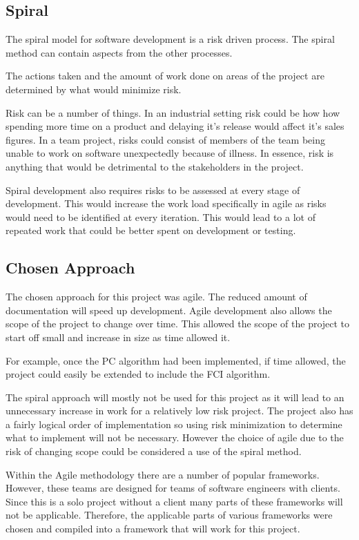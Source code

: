 \documentclass{UoYCSproject}
\begin{document}
\subsection{Spiral}
The spiral model for software development is a risk driven process. The spiral method can contain aspects from the other processes. ~\parencite{boehm1988spiral}

The actions taken and the amount of work done on areas of the project are determined by what would minimize risk.

Risk can be a number of things. In an industrial setting risk could be how how spending more time on a product and delaying it's release would affect it's sales figures. In a team project, risks could  consist of members of the team being unable to work on software unexpectedly because of illness. In essence, risk is anything that would be detrimental to the stakeholders in the project.

Spiral development also requires risks to be assessed at every stage of development. This would increase the work load specifically in agile as risks would need to be identified at every iteration. This would lead to a lot of repeated work that could be better spent on development or testing.  
\subsection{Chosen Approach}

The chosen approach for this project was agile. The reduced amount of documentation will speed up development. Agile development also allows the scope of the project to change over time. This allowed the scope of the project to start off small and increase in size as time allowed it.

For example, once the PC algorithm had been implemented, if time allowed, the project could easily be extended to include the FCI algorithm.

The spiral approach will mostly not be used for this project as it will lead to an unnecessary increase in work for a relatively low risk project. The project also has a fairly logical order of implementation so using risk minimization to determine what to implement will not be necessary. However the choice of agile due to the risk of changing scope could be considered a use of the spiral method.

Within the Agile methodology there are a number of popular frameworks. However, these teams are designed for teams of software engineers with clients. Since this is a solo project without a client many parts of these frameworks will not be applicable. Therefore, the applicable parts of various frameworks were chosen and compiled into a framework that will work for this project.
\end{document}
